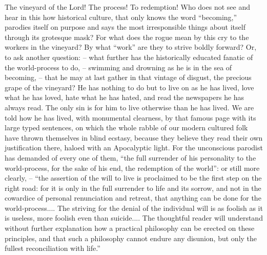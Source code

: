 The vineyard of the Lord! The process! To redemption! Who does not
see and hear in this how historical culture, that only knows the word
\enquote{becoming,} parodies itself on purpose and says the most
irresponsible things about itself through its grotesque mask? For
what does the rogue mean by this cry to the workers in the vineyard?
By what \enquote{work} are they to strive boldly forward? Or, to ask another
question: -- what further has the historically educated fanatic of the
world-process to do, -- swimming and drowning as he is in the sea of
becoming, -- that he may at last gather in that vintage of disgust, the
precious grape of the vineyard? He has nothing to do but to live on
as he has lived, love what he has loved, hate what he has hated, and
read the newspapers he has always read. The only sin is for him to
live otherwise than he has lived. We are told how he has lived, with
monumental clearness, by that famous page with its large typed
sentences, on which the whole rabble of our modern cultured folk have
thrown themselves in blind ecstasy, because they believe they read
their own justification there, haloed with an Apocalyptic light. For
the unconscious parodist has demanded of every one of them, \enquote{the full
surrender of his personality to the world-process, for the sake of
his end, the redemption of the world}: or still more clearly, -- \enquote{the
assertion of the will to live is proclaimed to be the first step on
the right road: for it is only in the full surrender to life and its
sorrow, and not in the cowardice of personal renunciation and
retreat, that anything can be done for the world-process.... The
striving for the denial of the individual will is as foolish as it is
useless, more foolish even than suicide.... The thoughtful reader
will understand without further explanation how a practical
philosophy can be erected on these principles, and that such a
philosophy cannot endure any disunion, but only the fullest
reconciliation with life.}

